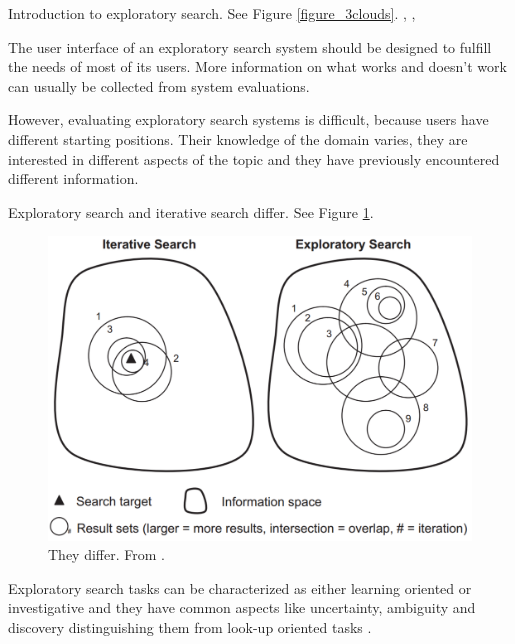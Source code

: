 Introduction to exploratory search. See Figure \ref{figure_3clouds}.
\cite{march06}, \cite{white09}, \cite{tvaro11}

The user interface of an exploratory search system should be designed to fulfill the needs of most of its users. More information on what works and doesn't work can usually be collected from system evaluations.

However, evaluating exploratory search systems is difficult, because users have different starting positions. Their knowledge of the domain varies, they are interested in different aspects of the topic and they have previously encountered different information. \cite{kules08}

Exploratory search and iterative search differ. See Figure \ref{figure_IterativeVsExploratory}.

\begin{figure}[htp] %
\caption{They differ. From \protect\cite{white09}.}
\label{figure_IterativeVsExploratory}
\centering
\includegraphics[scale=0.25]{figures/IterativeSearch_vs_ExploratorySearch.pdf}
\end{figure}

Exploratory search tasks can be characterized as either learning oriented or investigative  and they have common aspects like uncertainty, ambiguity and discovery distinguishing them from look-up oriented tasks \cite{kules09}.

